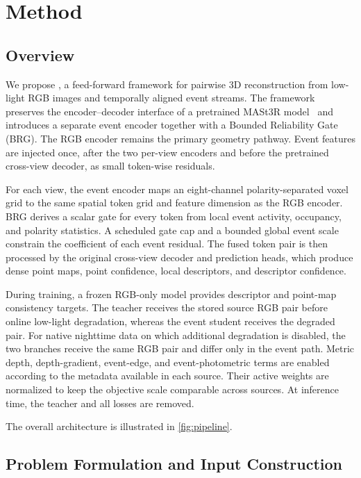 \section{Method}
\label{sec:method}


\subsection{Overview}
\label{sec:method:overview}

We propose \ourMethod{}, a feed-forward framework for pairwise 3D
reconstruction from low-light RGB images and temporally aligned event streams.
The framework preserves the encoder--decoder interface of a pretrained
MASt3R model~\cite{dust3r_cvpr24,mast3r_eccv24} and introduces a separate event
encoder together with a Bounded Reliability Gate (BRG).  The RGB encoder
remains the primary geometry pathway.  Event features are injected once, after
the two per-view encoders and before the pretrained cross-view decoder, as
small token-wise residuals.

For each view, the event encoder maps an eight-channel polarity-separated
voxel grid to the same spatial token grid and feature dimension as the RGB
encoder.  BRG derives a scalar gate for every token from local event activity,
occupancy, and polarity statistics.  A scheduled gate cap and a bounded global
event scale constrain the coefficient of each event residual.  The fused token
pair is then processed by the original cross-view decoder and prediction heads,
which produce dense point maps, point confidence, local descriptors, and
descriptor confidence.

During training, a frozen RGB-only model provides descriptor and point-map
consistency targets.  The teacher receives the stored source RGB pair before
online low-light degradation, whereas the event student receives the degraded
pair.  For native nighttime data on which additional degradation is disabled,
the two branches receive the same RGB pair and differ only in the event path.
Metric depth, depth-gradient, event-edge, and event-photometric terms are
enabled according to the metadata available in each source.  Their active
weights are normalized to keep the objective scale comparable across sources.
At inference time, the teacher and all losses are removed.

The overall architecture is illustrated in \cref{fig:pipeline}.


\subsection{Problem Formulation and Input Construction}
\label{sec:method:formulation}

